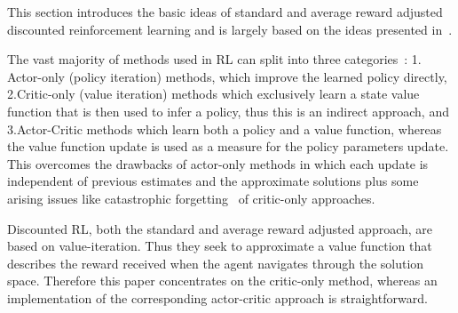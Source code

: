 \documentclass[envcountsame]{llncs}
\begin{document}
This section introduces the basic ideas of standard and average reward adjusted discounted
reinforcement learning and is largely based on the ideas presented
in~\cite{schneckenreither2020average}.

The vast majority of methods used in RL can split into three categories~\cite{konda2000actor}: 1.\@
Actor-only (policy iteration) methods, which improve the learned policy directly, 2.\@ Critic-only
(value iteration) methods which exclusively learn a state value function that is then used to infer
a policy, thus this is an indirect approach, and 3.\@ Actor-Critic methods which learn both a policy
and a value function, whereas the value function update is used as a measure for the policy
parameters update. This overcomes the drawbacks of actor-only methods in which each update is
independent of previous estimates and the approximate solutions plus some arising issues like
catastrophic forgetting~\cite{french1999catastrophic} of critic-only approaches.

Discounted RL, both the standard and average reward adjusted approach, are based on value-iteration.
Thus they seek to approximate a value function that describes the reward received when the agent
navigates through the solution space. Therefore this paper concentrates on the critic-only method,
whereas an implementation of the corresponding actor-critic approach is straightforward.
\end{document}
